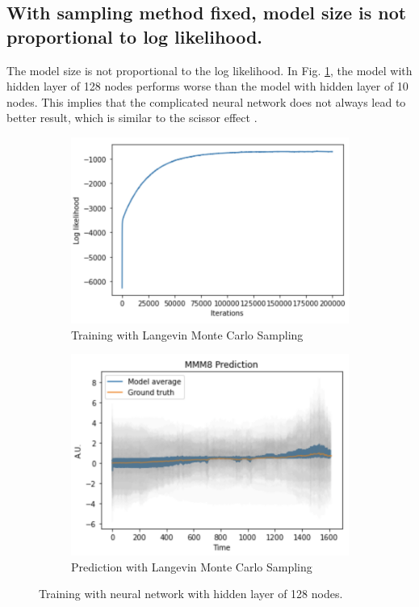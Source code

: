 \documentclass{article}
\begin{document}
\subsection{With sampling method fixed, model size is not proportional to log likelihood.}

The model size is not proportional to the log likelihood. In Fig. \ref{fig:big-net-training}, the model with hidden layer of 128 nodes performs worse than the model with hidden layer of 10 nodes. This implies that the complicated neural network does not always lead to better result, which is similar to the scissor effect \citep[Ch 1.]{braga2020fundamentals}.
 
\begin{figure}[h]
    \begin{subfigure}[b]{0.5\textwidth}
        \centering
        \includegraphics[width=\textwidth]{../img/training_Langevin_200000_128.png}
        \caption{Training with Langevin Monte Carlo Sampling}
        \label{fig:big-net-training}
    \end{subfigure}\hfill
    \begin{subfigure}[b]{0.5\textwidth}
        \centering
        \includegraphics[trim={0 0 0 0.7cm}, clip, width=\textwidth]{../img/prediction_Langevin_200000_128.png}
        \caption{Prediction with Langevin Monte Carlo Sampling}
    \end{subfigure}
    \caption{Training with neural network with hidden layer of 128 nodes.}
\end{figure}
\end{document}
